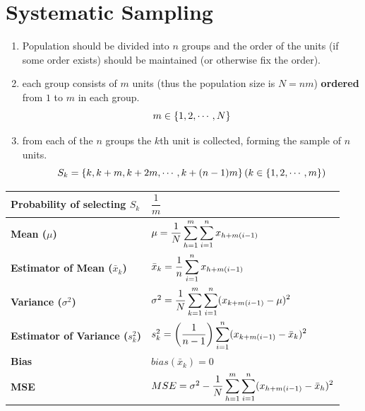 \section{Systematic Sampling \cite{ism-1}}\label{Systematic Sampling}

\begin{enumerate}
    \item Population should be divided into $n$ groups and the order of the units (if some order exists) should be maintained (or otherwise fix the order).

    \item each group consists of $m$ units (thus the population size is $N = nm$) \textbf{ordered} from $1$ to $m$ in each group.
    \[
        m \in \left\{1,2,\cdots,N\right\}
    \]

    \item from each of the $n$ groups the $k$th unit is collected, forming the sample of $n$ units. 
    \[
        S_k = \dCurlyBrac{ k, k+m,k+2m,\cdots,k+(n-1)m }
        \hfill
        (k \in \dCurlyBrac{1,2,\cdots,m})
    \]
\end{enumerate}

\begin{customTableWrapper}{2}
\begin{longtable}{|p{5cm}|p{9cm}|}
    \hline\endfirsthead
    \hline\endhead
    \hline\endfoot
    \hline\endlastfoot

    \textbf{Probability of selecting $S_k$} & $\dfrac{1}{m}$\\[1ex]
    \hline

    \textbf{Mean ($\mu$)} & $
        \mu = \dfrac{1}{N}
        \displaystyle\sum_{h=1}^{m}
        \displaystyle\sum_{i=1}^{n} 
        x_{h+m(i-1)}
    $\\[1ex]
    \hline

    \textbf{Estimator of Mean ($\bar{x}_k$)} & $
        \bar{x}_k = 
        \dfrac{1}{n} \displaystyle\sum_{i=1}^{n}
        x_{h+m(i-1)}
    $\\[1ex]
    \hline

    \textbf{Variance ($\sigma^2$)} & $
        \sigma^2 = 
        \dfrac{1}{N}
        \displaystyle\sum_{k=1}^{m}
        \displaystyle\sum_{i=1}^{n}
        (x_{k+m(i-1)} - \mu)^2
    $\\[1ex]
    \hline

    \textbf{Estimator of Variance ($s_k^2$)} & $
        s_k^2 = \left(\dfrac{1}{n-1}\right)
        \displaystyle\sum_{i=1}^{n}
        (x_{k+m(i-1)} - \bar{x}_k)^2
    $\\[1ex]
    \hline

    \textbf{Bias} & $bias(\bar{x}_k) = 0$\\
    \hline

    \textbf{MSE} & $
        MSE = \sigma^2 -
        \dfrac{1}{N}
        \displaystyle\sum_{h=1}^{m}
        \displaystyle\sum_{i=1}^{n}
        (x_{h+m(i-1)} - \bar{x}_h)^2
    $\\[1ex]
    \hline
\end{longtable}
\end{customTableWrapper}

